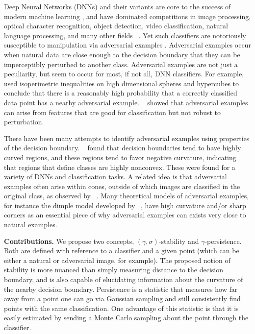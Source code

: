 Deep Neural Networks (DNNs) and their variants are core to the success of modern machine learning \cite{prakash2018}, and have dominated competitions in image processing, optical character recognition, object detection, video classification, natural language processing, and many other fields ~\cite{SCHMIDHUBER201585}. Yet such classifiers are notoriously susceptible to manipulation via adversarial examples \cite{Szegedy2013}. Adversarial examples occur when natural data are close enough to the decision boundary that they can be imperceptibly perturbed to another class. Adversarial examples are not just a peculiarity, but seem to occur for most, if not all, DNN classifiers. For example, ~\cite{shafahi2018are} used isoperimetric inequalities on high dimensional spheres and hypercubes to conclude that there is a reasonably high probability that a correctly classified data point has a nearby adversarial example. ~\cite{ilyas2019adversarial} showed that adversarial examples can arise from features that are good for classification but not robust to perturbation.


There have been many attempts to identify adversarial examples using properties of the decision boundary. ~\cite{Fawzi2018empirical} found that decision boundaries tend to have highly curved regions, and these regions tend to favor negative curvature, indicating that regions that define classes are highly nonconvex. These were found for a variety of DNNs and classification tasks. 
A related idea is that adversarial examples often arise within cones, outside of which images are classified in the original class, as observed by ~\cite{roth19aodds}. Many theoretical models of adversarial examples, for instance the dimple model developed by ~\cite{shamir2021}, have high curvature and/or sharp corners as an essential piece of why adversarial examples can exists very close to natural examples.



{\bf Contributions.} We propose two concepts, $(\gamma,\sigma)$-stability and $\gamma$-persistence.  Both are defined with reference to a classifier and a given point (which can be either a natural or adversarial image, for example). The proposed notion of stability is more nuanced than simply measuring distance to the decision boundary, and is also capable of elucidating information about the curvature of the nearby decision boundary.  Persistence is a statistic that measures how far away from a point one can go via Gaussian sampling and still consistently find points with the same classification. One advantage of this statistic is that it is easily estimated by sending a Monte Carlo sampling about the point through the classifier.


